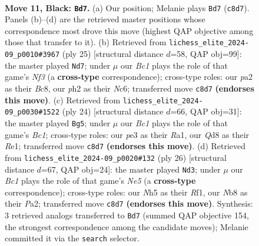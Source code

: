 \documentclass[11pt]{article}
\begin{document}
\clearpage

\begin{figure}[p]\centering
\begin{subfigure}{0.46\textwidth}\centering
\resizebox{\linewidth}{!}{%
\newchessgame
\chessboard[
  setfen={rnbq1rk1/pp3ppp/4p3/2P4n/2P5/3BPN2/P4PPP/R1BQ1RK1 b - - 0 11},
  showmover=false,
  pgfstyle=straightmove, color=movearrow, markmove={c8-d7}
]}
\caption{}
\end{subfigure}\hfill
\begin{subfigure}{0.46\textwidth}\centering
\resizebox{\linewidth}{!}{%
\newchessgame
\chessboard[
  setfen={r1bq1rk1/1p3pp1/p1n1pn1p/2P5/8/P1PBPN1P/5PP1/R1BQ1RK1 b - - 0 13},
  showmover=false,
  pgfstyle=straightmove, color=movearrow, markmove={f6-d7}
]}
\caption{}
\end{subfigure}
\\[4pt]
\begin{subfigure}{0.46\textwidth}\centering
\resizebox{\linewidth}{!}{%
\newchessgame
\chessboard[
  setfen={r2q1rk1/2p1bppp/p2p1n2/2p2P2/8/2N5/PPP2PPP/R1BQR1K1 w - - 3 13},
  showmover=false,
  pgfstyle=straightmove, color=movearrow, markmove={c1-g5}
]}
\caption{}
\end{subfigure}\hfill
\begin{subfigure}{0.46\textwidth}\centering
\resizebox{\linewidth}{!}{%
\newchessgame
\chessboard[
  setfen={r1bq1rk1/1p3ppp/p2p1n2/4N3/3Q4/4BP2/PPP3PP/R4RK1 w - - 0 14},
  showmover=false,
  pgfstyle=straightmove, color=movearrow, markmove={e5-d3}
]}
\caption{}
\end{subfigure}
\caption{\textbf{Move 11, Black: \texttt{Bd7}.} (a) Our position; Melanie plays \texttt{Bd7} (\texttt{c8d7}). Panels (b)--(d) are the retrieved master positions whose correspondence most drove this move (highest QAP objective among those that transfer to it). (b) Retrieved from \texttt{lichess\_elite\_2024-09\_p0010\#3967} (ply 25) [structural distance $d$=58, QAP obj=99]: the master played \texttt{Nd7}; under $\mu$ our \emph{Bc1} plays the role of that game's \emph{Nf3} (a \textbf{cross-type} correspondence); cross-type roles: our \emph{p}a2 as their \emph{B}c8, our \emph{p}h2 as their \emph{N}c6; transferred move \texttt{c8d7} \textbf{(endorses this move)}. (c) Retrieved from \texttt{lichess\_elite\_2024-09\_p0030\#1522} (ply 24) [structural distance $d$=66, QAP obj=31]: the master played \texttt{Bg5}; under $\mu$ our \emph{Bc1} plays the role of that game's \emph{Bc1}; cross-type roles: our \emph{p}e3 as their \emph{R}a1, our \emph{Q}d8 as their \emph{R}e1; transferred move \texttt{c8d7} \textbf{(endorses this move)}. (d) Retrieved from \texttt{lichess\_elite\_2024-09\_p0020\#132} (ply 26) [structural distance $d$=67, QAP obj=24]: the master played \texttt{Nd3}; under $\mu$ our \emph{Bc1} plays the role of that game's \emph{Ne5} (a \textbf{cross-type} correspondence); cross-type roles: our \emph{N}h5 as their \emph{R}f1, our \emph{N}b8 as their \emph{P}a2; transferred move \texttt{c8d7} \textbf{(endorses this move)}. Synthesis: 3 retrieved analogs transferred to \texttt{Bd7} (summed QAP objective 154, the strongest correspondence among the candidate moves); Melanie committed it via the \texttt{search} selector.}
\label{fig:thought-m21}
\end{figure}
\end{document}
